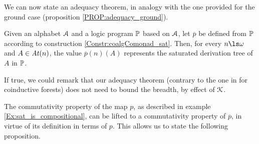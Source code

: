We can now state an adequacy theorem, in analogy with the one provided for the ground case (proposition \ref{PROP:adequacy_ground}).

\begin{theorem} Given an alphabet $\mathcal{A}$ and a logic program $\mathbb{P}$ based on $\mathcal{A}$, let $\overline{p}$ be defined from $\mathbb{P}$ according to construction \ref{Constr:coalgComonad_sat}. Then, for every $n\ls \omega$ and $A \in \mathit{At}(n)$, the value $\overline{p}(n)(A)$ represents the saturated derivation tree of $A$ in $\mathbb{P}$.
\end{theorem}

\begin{todo} If true, we could remark that our adequacy theorem (contrary to the one in \cite[Th. 4.5]{KomPowerCSL11} for coinductive forests) does not need to bound the breadth, by effect of $\mathcal{K}$. \end{todo}



The commutativity property of the map $p$, as described in example \ref{Ex:sat_is_compositional}, can be lifted to a commutativity property of $\overline{p}$, in virtue of its definition in terms of $p$. This allows us to state the following proposition.

